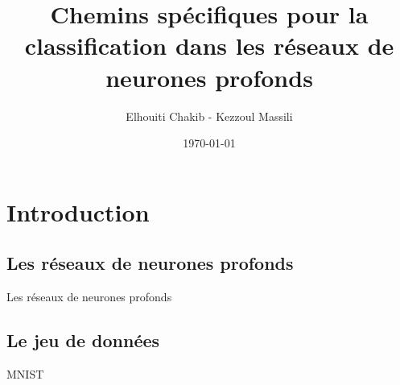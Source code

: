 \documentclass[10pt,handout]{beamer}
\title[Chemins spécifiques]{Chemins spécifiques pour la classification dans les réseaux de neurones profonds}
\author[Elhouiti, Kezzoul]{ Elhouiti Chakib - Kezzoul Massili \\}
\institute[]{Université de Montpellier}
\date{\today}
\newif\ifplacelogo %
\begin{document}
\placelogofalse
\begin{frame}
	\titlepage
\end{frame}

\placelogotrue

\section{Introduction}
\subsection{Les réseaux de neurones profonds}
\begin{frame}{Les réseaux de neurones profonds}
    
\end{frame}

\placelogofalse 
\subsection{Le jeu de données}
\begin{frame}{MNIST}
\end{frame}
\placelogotrue

\placelogofalse 
\end{document}
